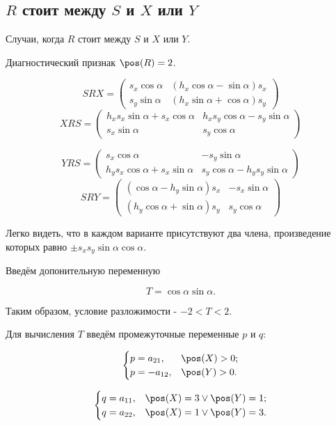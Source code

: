 \subsection{$R$ стоит между $S$ и $X$ или $Y$}

Случаи, когда $R$ стоит между $S$ и $X$ или $Y$.

Диагностический признак $\pos(R)=2$.

$$SRX = 
\begin{pmatrix}
	{s_x}\cos\alpha  & \left({h_x} \cos\alpha -\sin\alpha\right)  {s_x}\\
	{s_y}\sin\alpha  & \left({h_x} \sin\alpha +\cos\alpha\right)  {s_y}
\end{pmatrix}
$$
$$XRS = \begin{pmatrix}
	{h_x} {s_x} \sin\alpha + {s_x} \cos\alpha & {h_x} {s_y} \cos\alpha-{s_y} \sin\alpha\\
	{s_x} \sin\alpha & {s_y} \cos\alpha
\end{pmatrix}$$

$$YRS = \begin{pmatrix}
{s_x} \cos\alpha & -{s_y} \sin\alpha\\
{h_y} {s_x} \cos\alpha+{s_x} \sin\alpha & {s_y} \cos\alpha-{h_y} {s_y} \sin\alpha
\end{pmatrix}$$
$$SRY =
\begin{pmatrix}
\left( \cos\alpha-{h_y} \sin\alpha\right)  {s_x} & -{s_x} \sin\alpha\\
\left( {h_y} \cos\alpha+\sin\alpha\right)  {s_y} & {s_y} \cos\alpha
\end{pmatrix}
$$

Легко видеть, что в каждом варианте присутствуют два члена, произведение которых равно $\pm s_x s_y \sin\alpha \cos\alpha$.

Введём допонительную переменную

$$T = \cos\alpha\sin\alpha.$$

Таким образом, условие разложимости - $-2<T<2$. 

Для вычисления $T$ введём промежуточные переменные $p$ и $q$:

$$\begin{cases}
	p = a_{21}, & \pos(X)>0;\\
	p = -a_{12}, & \pos(Y)>0.
\end{cases}$$

$$\begin{cases}
	q = a_{11}, & \pos(X)=3 \vee \pos(Y)=1;\\
	q = a_{22}, & \pos(X)=1 \vee \pos(Y)=3.
\end{cases}$$

